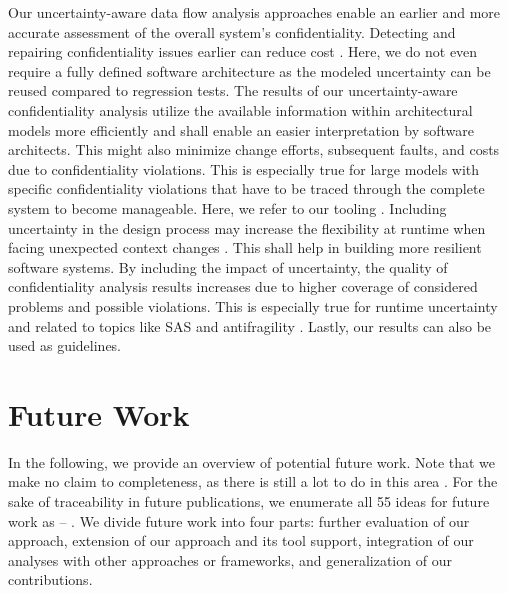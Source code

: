 Our uncertainty-aware data flow analysis approaches enable an earlier and more accurate assessment of the overall system's confidentiality.
Detecting and repairing confidentiality issues earlier can reduce cost \cite{boehm_software_2001}.
Here, we do not even require a fully defined software architecture as the modeled uncertainty can be reused compared to regression tests.
The results of our uncertainty-aware confidentiality analysis utilize the available information within architectural models more efficiently and shall enable an easier interpretation by software architects. 
This might also minimize change efforts, subsequent faults, and costs due to confidentiality violations.
This is especially true for large models with specific confidentiality violations that have to be traced through the complete system to become manageable. 
Here, we refer to our tooling \abunai.
Including uncertainty in the design process may increase the flexibility at runtime when facing unexpected context changes \cite{bures_capturing_2020}.
This shall help in building more resilient software systems.
By including the impact of uncertainty, the quality of confidentiality analysis results increases due to higher coverage of considered problems and possible violations.
This is especially true for runtime uncertainty and related to topics like \acf{SAS} \cite{sobhy_evaluation_2021,hezavehi_uncertainty_2021} and antifragility \cite{gorgeon_anti-fragile_2015,de_bruijn_antifragility_2020,ramezani_approaches_2020}.
Lastly, our results can also be used as guidelines.





\section{Future Work}%
\label{sec:conclusion:futurework}

In the following, we provide an overview of potential future work.
Note that we make no claim to completeness, as there is still a lot to do in this area \cite{weyns_towards_2023,hezavehi_uncertainty_2021}.
For the sake of traceability in future publications, we enumerate all 55 ideas for future work as  -- .
We divide future work into four parts: further evaluation of our approach, extension of our approach and its tool support, integration of our analyses with other approaches or frameworks, and generalization of our contributions.


